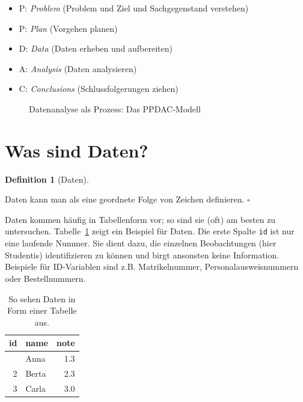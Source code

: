 \documentclass[
  letterpaper,
  oneside,
  open=any]{scrbook}
\providecommand{\tightlist}{%
  \setlength{\itemsep}{0pt}\setlength{\parskip}{0pt}}\usepackage{longtable,booktabs,array}
\theoremstyle{definition}
\theoremstyle{definition}
\theoremstyle{definition}
\newtheorem{definition}{Definition}[chapter]
\theoremstyle{remark}
\begin{document}
\begin{itemize}
\tightlist
\item
  P: \emph{Problem} (Problem und Ziel und Sachgegenstand verstehen)
\item
  P: \emph{Plan} (Vorgehen planen)
\item
  D: \emph{Data} (Daten erheben und aufbereiten)
\item
  A: \emph{Analysis} (Daten analysieren)
\item
  C: \emph{Conclusions} (Schlussfolgerungen ziehen)
\end{itemize}

\begin{figure}


\caption{\label{fig-ppdac}Datenanalyse als Prozess: Das PPDAC-Modell}

\end{figure}%

\section{Was sind Daten?}\label{was-sind-daten}

\begin{definition}[Daten]\protect\hypertarget{def-daten}{}\label{def-daten}

Daten kann man als eine geordnete Folge von Zeichen definieren.
\(\square\)

\end{definition}

Daten kommen häufig in Tabellenform vor; so sind sie (oft) am besten zu
untersuchen. Tabelle~\ref{tbl-daten} zeigt ein Beispiel für Daten. Die
erste Spalte \texttt{id} ist nur eine laufende Nummer. Sie dient dazu,
die einzelnen Beobachtungen (hier Studentis) identifizieren zu können
und birgt ansonsten keine Information. Beispiele für ID-Variablen sind
z.B. Matrikelnummer, Personalausweisnummern oder Bestellnummern.

\begin{longtable}[]{@{}rlr@{}}

\caption{\label{tbl-daten}So sehen Daten in Form einer Tabelle aus.}

\tabularnewline

\toprule\noalign{}
id & name & note \\
\midrule\noalign{}
\endhead
\bottomrule\noalign{}
\endlastfoot
1 & Anna & 1.3 \\
2 & Berta & 2.3 \\
3 & Carla & 3.0 \\

\end{longtable}
\end{document}
